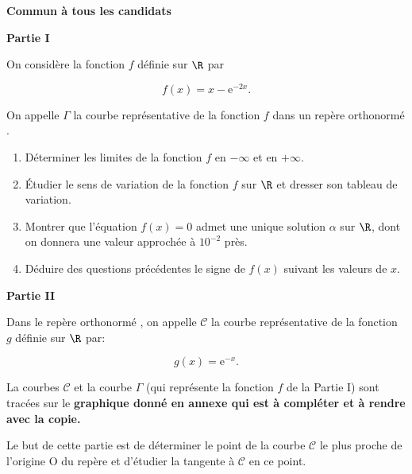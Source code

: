 
\textbf{Commun à tous les candidats}

\medskip

\begin{center}\textbf{Partie I}\end{center}

On considère la fonction $f$ définie sur $\R$ par 

\[f(x) = x - \text{e}^{-2x}.\]

On appelle $\Gamma$ la courbe représentative de la fonction $f$ dans un repère orthonormé \Oij.

\medskip

\begin{enumerate}
\item Déterminer les limites de la fonction $f$ en $- \infty$ et en $+ \infty$.
\item Étudier le sens de variation de la fonction $f$ sur $\R$ et dresser son tableau de variation.
\item Montrer que l'équation $f(x) = 0$ admet une unique solution $\alpha$ sur $\R$, dont on donnera une valeur approchée à $10^{-2}$ près.
\item Déduire des questions précédentes le signe de $f(x)$ suivant les valeurs de $x$.
\end{enumerate}

\begin{center}\textbf{Partie II}\end{center}


Dans le repère orthonormé \Oij, on appelle $\mathcal{C}$ la courbe représentative de la fonction $g$ définie sur $\R$ par:

\[g(x) = \text{e}^{-x}.\]

 La courbes $\mathcal{C}$ et la courbe $\Gamma$ (qui représente la fonction $f$ de la Partie I) sont tracées sur le \textbf{graphique donné en annexe qui est à compléter et à rendre avec la copie.}

\smallskip

Le but de cette partie est de déterminer le point de la courbe $\mathcal{C}$ le plus proche de l'origine O du repère et d'étudier la tangente à $\mathcal{C}$ en ce point.

\medskip


